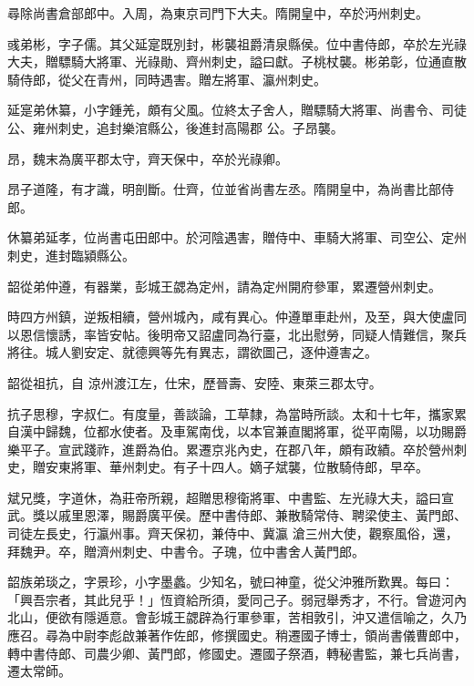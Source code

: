 \begin{pinyinscope}
 尋除尚書倉部郎中。入周，為東京司門下大夫。隋開皇中，卒於沔州刺史。



 彧弟彬，字子儒。其父延寔既別封，彬襲祖爵清泉縣侯。位中書侍郎，卒於左光祿大夫，贈驃騎大將軍、光祿勛、齊州刺史，謚曰獻。子桃杖襲。彬弟彰，位通直散騎侍郎，從父在青州，同時遇害。贈左將軍、瀛州刺史。



 延寔弟休纂，小字鍾羌，頗有父風。位終太子舍人，贈驃騎大將軍、尚書令、司徒公、雍州刺史，追封樂涫縣公，後進封高陽郡
 公。子昂襲。



 昂，魏末為廣平郡太守，齊天保中，卒於光祿卿。



 昂子道隆，有才識，明剖斷。仕齊，位並省尚書左丞。隋開皇中，為尚書比部侍郎。



 休纂弟延孝，位尚書屯田郎中。於河陰遇害，贈侍中、車騎大將軍、司空公、定州刺史，進封臨潁縣公。



 韶從弟仲遵，有器業，彭城王勰為定州，請為定州開府參軍，累遷營州刺史。



 時四方州鎮，逆叛相續，營州城內，咸有異心。仲遵單車赴州，及至，與大使盧同以恩信懷誘，率皆安帖。後明帝又詔盧同為行臺，北出慰勞，同疑人情難信，聚兵將往。城人劉安定、就德興等先有異志，謂欲圖己，逐仲遵害之。



 韶從祖抗，自
 涼州渡江左，仕宋，歷晉壽、安陸、東萊三郡太守。



 抗子思穆，字叔仁。有度量，善談論，工草隸，為當時所談。太和十七年，攜家累自漢中歸魏，位都水使者。及車駕南伐，以本官兼直閣將軍，從平南陽，以功賜爵樂平子。宣武踐祚，進爵為伯。累遷京兆內史，在郡八年，頗有政績。卒於營州刺史，贈安東將軍、華州刺史。有子十四人。嫡子斌襲，位散騎侍郎，早卒。



 斌兄獎，字道休，為莊帝所親，超贈思穆衛將軍、中書監、左光祿大夫，謚曰宣武。獎以戚里恩澤，賜爵廣平侯。歷中書侍郎、兼散騎常侍、聘梁使主、黃門郎、司徒左長史，行瀛州事。齊天保初，兼侍中、冀瀛
 滄三州大使，觀察風俗，還，拜魏尹。卒，贈濟州刺史、中書令。子瑰，位中書舍人黃門郎。



 韶族弟琰之，字景珍，小字墨蠡。少知名，號曰神童，從父沖雅所歎異。每曰：「興吾宗者，其此兒乎！」恆資給所須，愛同己子。弱冠舉秀才，不行。曾遊河內北山，便欲有隱遁意。會彭城王勰辟為行軍參軍，苦相敦引，沖又遣信喻之，久乃應召。尋為中尉李彪啟兼著作佐郎，修撰國史。稍遷國子博士，領尚書儀曹郎中，轉中書侍郎、司農少卿、黃門郎，修國史。遷國子祭酒，轉秘書監，兼七兵尚書，遷太常師。




\end{pinyinscope}
